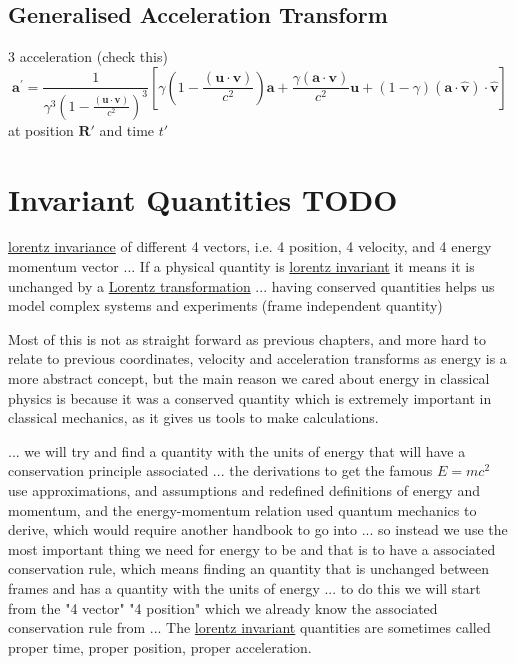 \section{Generalised Acceleration Transform}

3 acceleration (check this)
\begin{equation}%
	\mathbf{a^{'}} = \frac{1}{\gamma ^3 \left(1-\frac{(\mathbf{u}\cdot \mathbf{v})}{c^2}\right)^3}\left[ \gamma  \left(1-\frac{(\mathbf{u}\cdot\mathbf{v})}{c^2}\right)\mathbf{a}+\frac{\gamma (\mathbf{a}\cdot\mathbf{v})}{c^2}\mathbf{u} + (1-\gamma ) (\mathbf{a}\cdot\hat{\mathbf{v}}) \cdot\hat{\mathbf{v}}\right]
\end{equation}%
at position $\mathbf{R'}$ and time $t'$

\chapter{Invariant Quantities TODO}
\hyperlink{def-lorentz-invariant}{lorentz invariance} of different 4 vectors, i.e. 4 position, 4 velocity, and 4 energy momentum vector
... If a physical quantity is \hyperlink{def-lorentz-invariant}{lorentz invariant} it means it is unchanged by a \hyperlink{def-lorentz-transform}{Lorentz transformation}
... having conserved quantities helps us model complex systems and experiments (frame independent quantity)


Most of this is not as straight forward as previous chapters, and more hard to relate to previous coordinates, velocity and acceleration transforms as energy is a more abstract concept, but the main reason we cared about energy in classical physics is because it was a conserved quantity which is extremely important in classical mechanics, as it gives us tools to make calculations.

... we will try and find a quantity with the units of energy that will have a conservation principle associated
... the derivations to get the famous $E=mc^2$ use approximations, and assumptions and redefined definitions of energy and momentum, and the energy-momentum relation used quantum mechanics to derive, which would require another handbook to go into
... so instead we use the most important thing we need for energy to be and that is to have a associated conservation rule, which means finding an quantity that is unchanged between frames and has a quantity with the units of energy
... to do this we will start from the "4 vector" "4 position" which we already know the associated conservation rule from
... The \hyperlink{def-lorentz-invariant}{lorentz invariant} quantities are sometimes called proper time, proper position, proper acceleration.

